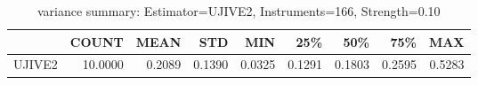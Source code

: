 \begin{table}[ht]
\centering
\caption{variance summary: Estimator=UJIVE2, Instruments=166, Strength=0.10}
\begin{tabular}{lrrrrrrrr}
\toprule
 & COUNT & MEAN & STD & MIN & 25\% & 50\% & 75\% & MAX \\
\midrule
UJIVE2 & 10.0000 & 0.2089 & 0.1390 & 0.0325 & 0.1291 & 0.1803 & 0.2595 & 0.5283 \\
\bottomrule
\end{tabular}
\end{table}
